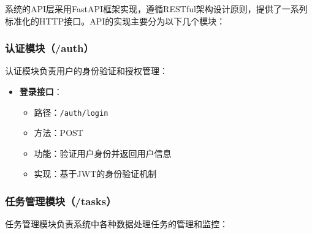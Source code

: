 系统的API层采用FastAPI框架实现，遵循RESTful架构设计原则，提供了一系列标准化的HTTP接口。API的实现主要分为以下几个模块：

\subsubsection{认证模块（/auth）}
认证模块负责用户的身份验证和授权管理：

\begin{itemize}
    \item \textbf{登录接口}：
    \begin{itemize}
        \item 路径：\texttt{/auth/login}
        \item 方法：POST
        \item 功能：验证用户身份并返回用户信息
        \item 实现：基于JWT的身份验证机制
    \end{itemize}
\end{itemize}

\subsubsection{任务管理模块（/tasks）}
任务管理模块负责系统中各种数据处理任务的管理和监控：

